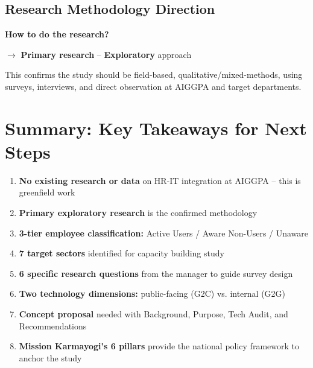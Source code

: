 \documentclass[12pt,a4paper]{article}
\begin{document}
\subsection{Research Methodology Direction}

\begin{insightbox}
\textbf{How to do the research?}

$\rightarrow$ \textbf{Primary research} -- \textbf{Exploratory} approach

This confirms the study should be field-based, qualitative/mixed-methods, using surveys, interviews, and direct observation at AIGGPA and target departments.
\end{insightbox}

\section*{Summary: Key Takeaways for Next Steps}

\begin{enumerate}[label=\textbf{\arabic*.}]
  \item \textbf{No existing research or data} on HR-IT integration at AIGGPA -- this is greenfield work
  \item \textbf{Primary exploratory research} is the confirmed methodology
  \item \textbf{3-tier employee classification:} Active Users / Aware Non-Users / Unaware
  \item \textbf{7 target sectors} identified for capacity building study
  \item \textbf{6 specific research questions} from the manager to guide survey design
  \item \textbf{Two technology dimensions:} public-facing (G2C) vs. internal (G2G)
  \item \textbf{Concept proposal} needed with Background, Purpose, Tech Audit, and Recommendations
  \item \textbf{Mission Karmayogi's 6 pillars} provide the national policy framework to anchor the study
\end{enumerate}
\end{document}
